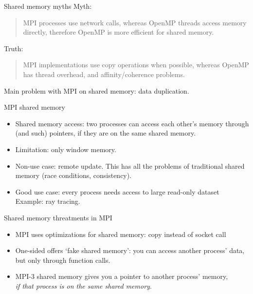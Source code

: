 
\begin{numberedframe}{Shared memory myths}
  Myth:
  \begin{quote}
    MPI processes use network calls, whereas OpenMP threads access memory directly,
    therefore OpenMP is more efficient for shared memory.
  \end{quote}
  Truth:
  \begin{quote}
    MPI implementations use copy operations when possible, whereas OpenMP
    has thread overhead, and affinity/coherence problems.
  \end{quote}
  Main problem with MPI on shared memory: data duplication.
\end{numberedframe}

\begin{numberedframe}{MPI shared memory}
  \begin{itemize}
  \item Shared memory access: two processes can access each other's
    memory through  (and such) pointers, if they are
    on the same shared memory.
  \item Limitation: only window memory.
  \item Non-use case: remote update. This has all the problems of
    traditional shared memory (race conditions, consistency).
  \item Good use case: every process needs access to large read-only
    dataset\\ Example: ray tracing.
  \end{itemize}
\end{numberedframe}

\begin{numberedframe}{Shared memory threatments in MPI}
  \begin{itemize}
  \item MPI uses optimizations for shared memory: copy instead of
    socket call
  \item One-sided offers `fake shared memory': you can access another
    process' data, but only through function calls.
  \item MPI-3 shared memory gives you a pointer to another process'
    memory,\\
    \emph{if that process is on the same shared memory}.
  \end{itemize}
\end{numberedframe}

